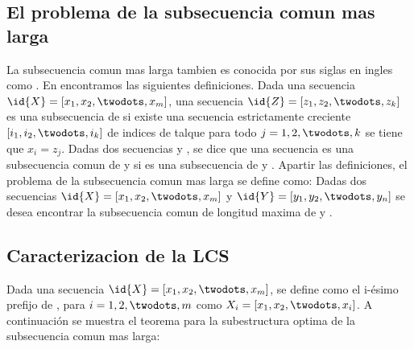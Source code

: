 
\subsection{El problema de la subsecuencia comun mas larga}
La subsecuencia comun mas larga tambien es conocida por sus siglas en ingles como . En \cite{Cormen2009} encontramos las siguientes definiciones. Dada una secuencia $\id{X} = [x_1, x_2, \twodots, x_m]$, una secuencia $\id{Z} = [z_1, z_2, \twodots, z_k]$ es una subsecuencia de  si existe una secuencia estrictamente creciente $[i_1,i_2,\twodots,i_k]$ de indices de  talque para todo $j=1,2,\twodots,k$ se tiene que $x_i = z_j$. Dadas dos secuencias  y , se dice que una secuencia  es una subsecuencia comun de  y  si  es una subsecuencia de  y . Apartir las definiciones, el problema de la subsecuencia comun mas larga se define como: Dadas dos secuencias $\id{X} =[x_1, x_2, \twodots, x_m]$ y $\id{Y} = [y_1, y_2, \twodots, y_n]$ se desea encontrar la subsecuencia comun de longitud maxima de  y .

\subsection{Caracterizacion de la LCS}
Dada una secuencia $\id{X} = [x_1, x_2, \twodots, x_m]$, se define como el i-ésimo prefijo de , para $i=1,2,\twodots,m$ como $X_i=[x_1,x_2,\twodots,x_i]$. A continuación se muestra el teorema para la subestructura optima de la subsecuencia comun mas larga:

